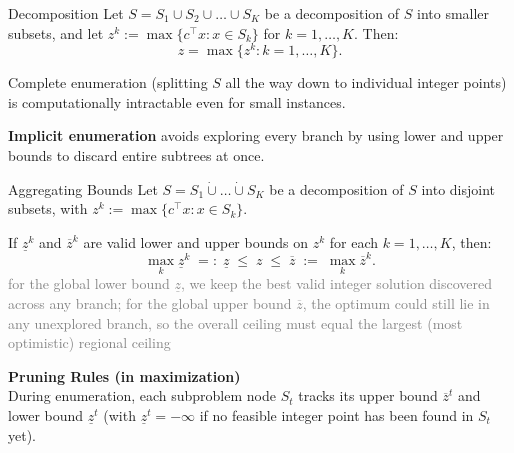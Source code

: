\documentclass[a4paper, 11pt]{report}
\begin{document}
\begin{thmframe}{Decomposition}{}
 Let $S = S_1 \cup S_2 \cup \dots \cup S_K$ be a decomposition of $S$ into smaller subsets, and let $z^k := \max \{ c^\top x : x \in S_k \}$ for $k = 1, \dots, K$. Then:
$$ z = \max \{ z^k : k = 1, \dots, K \}. $$
\end{thmframe}

Complete enumeration (splitting $S$ all the way down to individual integer points) is computationally intractable even for small instances. 

\textbf{Implicit enumeration} avoids exploring every branch by using lower and upper bounds to discard entire subtrees at once.

\begin{thmframe}{Aggregating Bounds}{}
Let $S = S_1 \dot{\cup} \dots \dot{\cup} S_K$ be a decomposition of $S$ into disjoint subsets, with $z^k := \max \{ c^\top x : x \in S_k \}$. 

If $\underline{z}^k$ and $\overline{z}^k$ are valid lower and upper bounds on $z^k$ for each $k = 1, \dots, K$, then:
$$ \max_k \underline{z}^k \;=:\; \underline{z} \;\leq\; z \;\leq\; \overline{z} \;:=\; \max_k \overline{z}^k. $$
\textcolor{gray}{for the global lower bound $\underline{z}$, we keep the best valid integer solution discovered across any branch; for the global upper bound $\overline{z}$, the optimum could still lie in any unexplored branch, so the overall ceiling must equal the largest (most optimistic) regional ceiling}
\end{thmframe}

\textbf{Pruning Rules (in maximization)}\\
During enumeration, each subproblem node $S_t$ tracks its upper bound $\overline{z}^t$ and lower bound $\underline{z}^t$ (with $\underline{z}^t = -\infty$ if no feasible integer point has been found in $S_t$ yet). 
\end{document}
